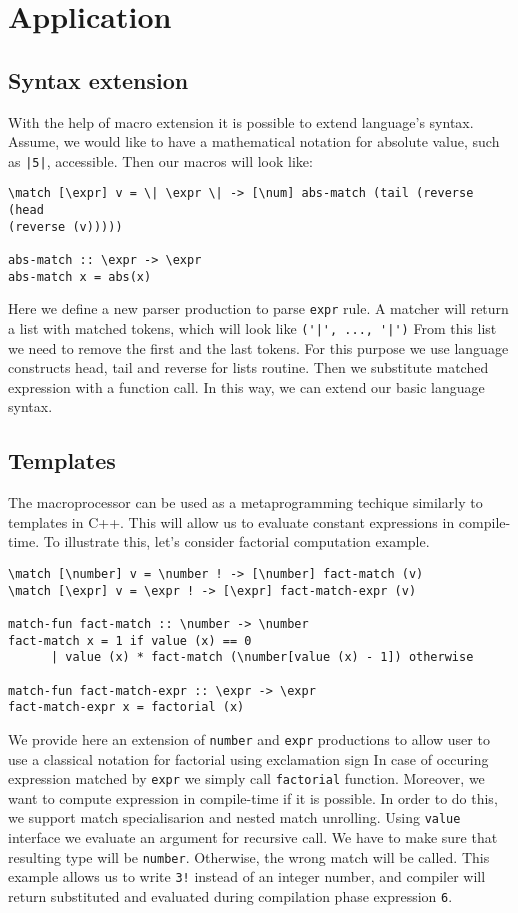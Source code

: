 \section{Application}
\subsection{Syntax extension}
With the help of macro extension it is possible to extend language's syntax.
Assume, we would like to have a mathematical notation for absolute value, such
as \verb/|5|/, accessible. Then our macros will look like:
\begin{verbatim}
\match [\expr] v = \| \expr \| -> [\num] abs-match (tail (reverse (head
(reverse (v)))))

abs-match :: \expr -> \expr
abs-match x = abs(x)
\end{verbatim}
Here we define a new parser production to parse \verb|expr| rule. A matcher
will return a list with matched tokens, which will look like 
\verb/('|', ..., '|')/ From this list we need to remove the first and the last
tokens. For this purpose we use language constructs head, tail and reverse for
lists routine.  Then we substitute matched expression with a function call. In
this way, we can extend our basic language syntax.
\subsection{Templates}
The macroprocessor can be used as a metaprogramming techique similarly to
templates in C++. This will allow us to evaluate constant expressions in compile-time.
To illustrate this, let's consider factorial computation example.
\begin{verbatim}
\match [\number] v = \number ! -> [\number] fact-match (v)
\match [\expr] v = \expr ! -> [\expr] fact-match-expr (v)

match-fun fact-match :: \number -> \number
fact-match x = 1 if value (x) == 0
      | value (x) * fact-match (\number[value (x) - 1]) otherwise

match-fun fact-match-expr :: \expr -> \expr
fact-match-expr x = factorial (x)
\end{verbatim}
We provide here an extension of \verb|number| and \verb|expr| productions to
allow user to use a classical notation for factorial using exclamation sign In
case of occuring expression matched by \verb|expr| we simply call
\verb|factorial| function. Moreover, we want to compute expression in
compile-time if it is possible. In order to do this, we support match
specialisarion and nested match unrolling. Using \verb|value| interface we
evaluate an argument for recursive call. We have to make sure that resulting
type will be \verb|number|. Otherwise, the wrong match will be called.  This
example allows us to write \verb|3!| instead of an integer  number, and
compiler will return substituted and evaluated during compilation phase
expression \verb|6|.
